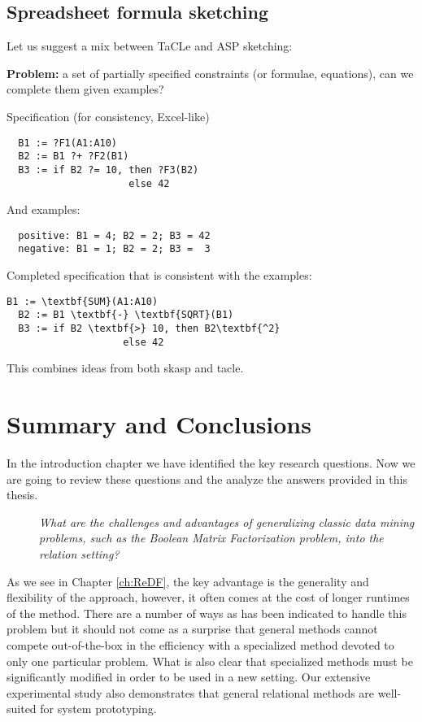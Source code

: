 \subsection{Spreadsheet formula sketching}
Let us suggest a mix between TaCLe and ASP sketching:

\textbf{Problem:} a set of partially specified constraints (or formulae, equations), can we complete them given examples?
 
  Specification (for consistency, Excel-like)
  \begin{verbatim}
  B1 := ?F1(A1:A10)
  B2 := B1 ?+ ?F2(B1)
  B3 := if B2 ?= 10, then ?F3(B2)
                     else 42
  \end{verbatim}
  And examples:
  \begin{verbatim}
  positive: B1 = 4; B2 = 2; B3 = 42 
  negative: B1 = 1; B2 = 2; B3 =  3
  \end{verbatim}
  

  Completed specification that is consistent with the examples:
  \begin{Verbatim}[commandchars=\\\{\}]
  B1 := \textbf{SUM}(A1:A10)
  B2 := B1 \textbf{-} \textbf{SQRT}(B1)
  B3 := if B2 \textbf{>} 10, then B2\textbf{^2}
                    else 42
  \end{Verbatim}

This combines ideas from both \acrshort{skasp} and \acrshort{tacle}.
  

\section{Summary and Conclusions}
In the introduction chapter we have identified the key research
questions. Now we are going to review these questions and the analyze the answers provided in this thesis.

\begin{description}
\item[\cone] \textit{What are the challenges and advantages of generalizing
    classic data mining problems, such as the Boolean Matrix
  Factorization problem, into the relation setting?}
\end{description}

As we see in Chapter \ref{ch:ReDF}, the key advantage is the
generality and flexibility of the approach, however, it often comes at
the cost of longer runtimes of the method. There are a number of ways
as has been indicated to handle this problem but it should not come as
a surprise that general methods cannot compete out-of-the-box in the efficiency with
a specialized method devoted to only one particular problem. What is
also clear that specialized methods must be significantly modified in
order to be used in a new setting. Our extensive experimental study
also demonstrates that general relational methods are well-suited for
system prototyping.


